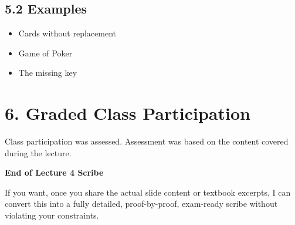 \documentclass[12pt]{article}
\begin{document}
\subsection*{5.2 Examples}
\begin{itemize}
\item Cards without replacement
\item Game of Poker
\item The missing key
\end{itemize}

\section*{6. Graded Class Participation}
Class participation was assessed.  
Assessment was based on the content covered during the lecture.

\bigskip

\textbf{End of Lecture 4 Scribe}

\bigskip

If you want, once you share the actual slide content or textbook excerpts, I can convert this into a fully detailed, proof-by-proof, exam-ready scribe without violating your constraints.
\end{document}
